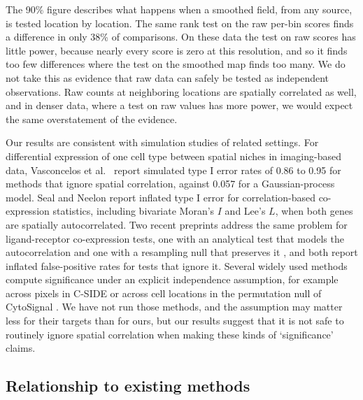 \documentclass[10pt,letterpaper]{article}
\begin{document}
The 90\% figure describes what happens when a smoothed field, from any source, is tested location by location. The same rank test on the raw per-bin scores finds a difference in only 38\% of comparisons. On these data the test on raw scores has little power, because nearly every score is zero at this resolution, and so it finds too few differences where the test on the smoothed map finds too many. We do not take this as evidence that raw data can safely be tested as independent observations. Raw counts at neighboring locations are spatially correlated as well, and in denser data, where a test on raw values has more power, we would expect the same overstatement of the evidence.

Our results are consistent with simulation studies of related settings. For differential expression of one cell type between spatial niches in imaging-based data, Vasconcelos et al.\ \cite{vasconcelos2026smide} report simulated type I error rates of 0.86 to 0.95 for methods that ignore spatial correlation, against 0.057 for a Gaussian-process model. Seal and Neelon \cite{seal2026spacebf} report inflated type I error for correlation-based co-expression statistics, including bivariate Moran's $I$ and Lee's $L$, when both genes are spatially autocorrelated. Two recent preprints address the same problem for ligand-receptor co-expression tests, one with an analytical test that models the autocorrelation \cite{zhao2026concise} and one with a resampling null that preserves it \cite{khatri2026soaar}, and both report inflated false-positive rates for tests that ignore it. Several widely used methods compute significance under an explicit independence assumption, for example across pixels in C-SIDE \cite{cable2022cside} or across cell locations in the permutation null of CytoSignal \cite{Liu2026}. We have not run those methods, and the assumption may matter less for their targets than for ours, but our results suggest that it is not safe to routinely ignore spatial correlation when making these kinds of `significance' claims.

\subsection*{Relationship to existing methods}
\end{document}
